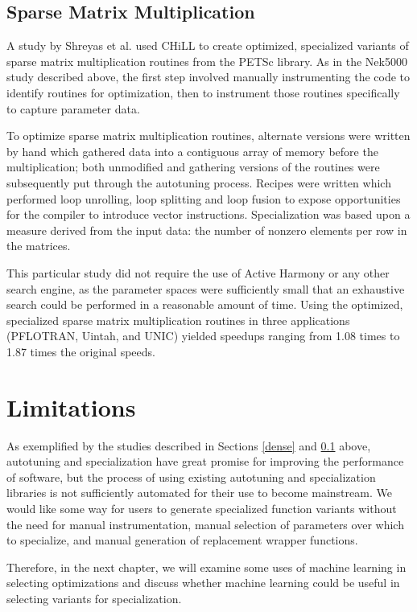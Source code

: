 \documentclass[msthesis,justified,copyright,final,numbers,sort&compress,
gsmodern,amstex,natbib]{uothesis}
\begin{document}
\subsection{Sparse Matrix Multiplication}
\label{sparse}

A study by Shreyas et al. \cite{shreyas} used CHiLL to create optimized, specialized variants of sparse matrix multiplication routines from the PETSc library. As in the Nek5000 study described above, the first step involved manually instrumenting the code to identify routines for optimization, then to instrument those routines specifically to capture parameter data. 

To optimize sparse matrix multiplication routines, alternate versions were written by hand which gathered data into a contiguous array of memory before the multiplication; both unmodified and gathering versions of the routines were subsequently put through the autotuning process. Recipes were written which performed loop unrolling, loop splitting and loop fusion to expose opportunities for the compiler to introduce vector instructions. Specialization was based upon a measure derived from the input data: the number of nonzero elements per row in the matrices.

This particular study did not require the use of Active Harmony or any other search engine, as the parameter spaces were sufficiently small that an exhaustive search could be performed in a reasonable amount of time. Using the optimized, specialized sparse matrix multiplication routines in three applications (PFLOTRAN, Uintah, and UNIC) yielded speedups ranging from 1.08 times to 1.87 times the original speeds.

\section{Limitations}

As exemplified by the studies described in Sections \ref{dense} and \ref{sparse} above, autotuning and specialization have great promise for improving the performance of software, but the process of using existing autotuning and specialization libraries is not sufficiently automated for their use to become mainstream. We would like some way for users to generate specialized function variants without the need for manual instrumentation, manual selection of parameters over which to specialize, and manual generation of replacement wrapper functions.

Therefore, in the next chapter, we will examine some uses of machine learning in selecting optimizations and discuss whether machine learning could be useful in selecting variants for specialization.
 
\end{document}
